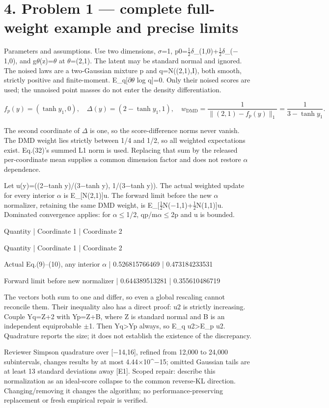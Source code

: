\documentclass[10pt]{article}
\begin{document}
\section*{4. Problem 1 — complete full-weight example and precise limits}
Parameters and assumptions. Use two dimensions, \(\sigma\)=1, p0=\(\tfrac12\)\(\delta\)\_(1,0)+\(\tfrac12\)\(\delta\)\_(\(-\)1,0), and g\(\theta\)(z)=\(\theta\) at \(\theta\)=(2,1). The latent may be standard normal and ignored. The noised laws are a two-Gaussian mixture p and q=N((2,1),I), both smooth, strictly positive and finite-moment. E\_q[\(\partial\)\(\theta\) log q]=0. Only their noised scores are used; the unnoised point masses do not enter the density differentiation.\par
\[f_p(y)=(\tanh y_1,0),\quad
\Delta(y)=(2-\tanh y_1,1),\quad
w_{\mathrm{DMD}}=\frac1{\|(2,1)-f_p(y)\|_1}=\frac1{3-\tanh y_1}.\]\par
The second coordinate of \(\Delta\) is one, so the score-difference norms never vanish. The DMD weight lies strictly between 1/4 and 1/2, so all weighted expectations exist. Eq.(32)’s summed L1 norm is used. Replacing that sum by the released per-coordinate mean supplies a common dimension factor and does not restore \(\alpha\) dependence.\par
Let u(y)=((2\(-\)tanh y)/(3\(-\)tanh y), 1/(3\(-\)tanh y)). The actual weighted update for every interior \(\alpha\) is E\_[N(2,1)]u. The forward limit before the new \(\alpha\) normalizer, retaining the same DMD weight, is E\_[\(\tfrac12\)N(\(-\)1,1)+\(\tfrac12\)N(1,1)]u. Dominated convergence applies: for \(\alpha\)\(\leq\)1/2, qp/m\(\alpha\)\(\leq\)2p and u is bounded.\par
Quantity | Coordinate 1 | Coordinate 2\par
Quantity | Coordinate 1 | Coordinate 2\par
Actual Eq.(9)–(10), any interior \(\alpha\) | 0.526815766469 | 0.473184233531\par
Forward limit before new normalizer | 0.644389513281 | 0.355610486719\par
The vectors both sum to one and differ, so even a global rescaling cannot reconcile them. Their inequality also has a direct proof: u2 is strictly increasing. Couple Yq=Z+2 with Yp=Z+B, where Z is standard normal and B is an independent equiprobable \(\pm\)1. Then Yq>Yp always, so E\_q u2>E\_p u2. Quadrature reports the size; it does not establish the existence of the discrepancy.\par
Reviewer Simpson quadrature over [\(-\)14,16], refined from 12,000 to 24,000 subintervals, changes results by at most 4.44\(\times\)10\textasciicircum{}\(-\)15; omitted Gaussian tails are at least 13 standard deviations away [E1]. Scoped repair: describe this normalization as an ideal-score collapse to the common reverse-KL direction. Changing/removing it changes the algorithm; no performance-preserving replacement or fresh empirical repair is verified.\par
\end{document}
